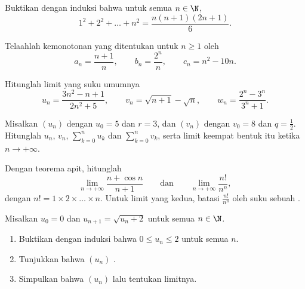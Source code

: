 \begin{exercise}[$\star$]\label{exo:g12:seq:1}
Buktikan dengan induksi bahwa untuk semua $n \in \N$,
\[
1^2 + 2^2 + \dots + n^2 = \frac{n(n+1)(2n+1)}{6}.
\]
\end{exercise}

\begin{exercise}[$\star$]\label{exo:g12:seq:2}
Telaahlah kemonotonan  yang ditentukan untuk $n \geq 1$ oleh
\[
a_n = \frac{n+1}{n}, \qquad
b_n = \frac{2^n}{n}, \qquad
c_n = n^2 - 10n .
\]
\end{exercise}

\begin{exercise}[$\star$]\label{exo:g12:seq:3}
Hitunglah limit  yang suku umumnya
\[
u_n = \frac{3n^2 - n + 1}{2n^2 + 5}, \qquad
v_n = \sqrt{n+1} - \sqrt{n}, \qquad
w_n = \frac{2^n - 3^n}{3^n + 1}.
\]
\end{exercise}

\begin{exercise}[$\star$]\label{exo:g12:seq:4}
Misalkan $(u_n)$  dengan $u_0 = 5$ dan 
$r = 3$, dan $(v_n)$  dengan $v_0 = 8$ dan 
$q = \frac{1}{2}$. Hitunglah $u_n$, $v_n$, $\sum_{k=0}^{n} u_k$ dan
$\sum_{k=0}^{n} v_k$, serta limit keempat bentuk itu ketika
$n \to +\infty$.
\end{exercise}

\begin{exercise}[$\star\star$]\label{exo:g12:seq:5}
Dengan teorema apit, hitunglah
\[
\lim_{n\to+\infty} \frac{n + \cos n}{n + 1}
\qquad\text{dan}\qquad
\lim_{n\to+\infty} \frac{n!}{n^n},
\]
dengan $n! = 1 \times 2 \times \dots \times n$. Untuk limit yang kedua, batasi
$\frac{n!}{n^n}$ oleh suku sebuah .
\end{exercise}

\begin{exercise}[$\star\star$]\label{exo:g12:seq:6}
Misalkan $u_0 = 0$ dan $u_{n+1} = \sqrt{u_n + 2}$ untuk semua $n \in \N$.
\begin{enumerate}
  \item Buktikan dengan induksi bahwa $0 \leq u_n \leq 2$ untuk semua $n$.
  \item Tunjukkan bahwa $(u_n)$ .
  \item Simpulkan bahwa $(u_n)$  lalu tentukan limitnya.
\end{enumerate}
\end{exercise}

